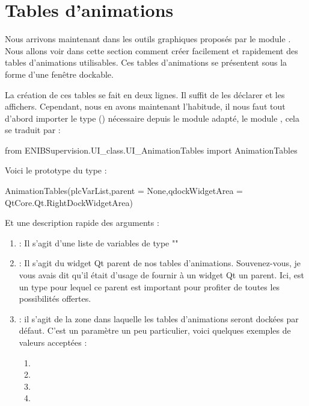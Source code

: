 \section{Tables d'animations}

Nous arrivons maintenant dans les outils graphiques proposés par le module .\newline
Nous allons voir dans cette section comment créer facilement et rapidement des tables d'animations utilisables.\newline
Ces tables d'animations se présentent sous la forme d'une fenêtre dockable.\smallSkip

La création de ces tables se fait en deux lignes. Il suffit de les déclarer et les affichers.\newline
Cependant, nous en avons maintenant l'habitude, il nous faut tout d'abord importer le type () nécessaire depuis le module adapté, le module , cela se traduit par :
\begin{pyCode}
from ENIBSupervision.UI_class.UI_AnimationTables import AnimationTables
\end{pyCode}
\smallSkip

Voici le prototype du type  :
\begin{pyCode}
AnimationTables(plcVarList,parent = None,qdockWidgetArea = QtCore.Qt.RightDockWidgetArea)
\end{pyCode}
Et une description rapide des arguments :
\begin{enumerate}
    \item {} : Il s'agit d'une liste de variables de type ""
    \item {} : Il s'agit du widget Qt parent de nos tables d'animations. Souvenez-vous, je vous avais dit qu'il était d'usage de fournir à un widget Qt un parent. Ici,  est un type pour lequel ce parent est important pour profiter de toutes les possibilités offertes.
    \item {} : il s'agit de la zone dans laquelle les tables d'animations seront dockées par défaut. C'est un paramètre un peu particulier, voici quelques exemples de valeurs acceptées :
    \begin{enumerate}
        \item {}
        \item {}
        \item {}
        \item {}
    \end{enumerate}
\end{enumerate}
\smallSkip

